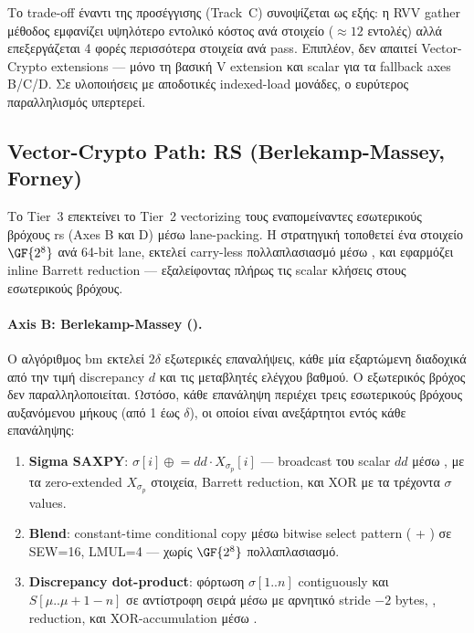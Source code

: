Το trade-off έναντι της \Zvbc προσέγγισης (Track~C) συνοψίζεται ως εξής:
η RVV gather μέθοδος εμφανίζει υψηλότερο εντολικό κόστος ανά στοιχείο
($\approx\num{12}$ εντολές) αλλά επεξεργάζεται \num{4} φορές περισσότερα
στοιχεία ανά pass.  Επιπλέον, δεν απαιτεί Vector-Crypto extensions —
μόνο τη βασική V extension και scalar \Zbc για τα fallback axes B/C/D.
Σε υλοποιήσεις με αποδοτικές indexed-load μονάδες, ο ευρύτερος
παραλληλισμός υπερτερεί.

\subsection{Vector-Crypto Path: \Zvbc RS (Berlekamp-Massey, Forney)}
\label{sec:decode-zvbc-bm-forney}

Το Tier~3 επεκτείνει το Tier~2 vectorizing τους εναπομείναντες εσωτερικούς
βρόχους \gls{rs} (Axes B και D) μέσω \Zvbc {} lane-packing.
Η στρατηγική τοποθετεί ένα στοιχείο $\GF{2^8}$ ανά 64-bit lane, εκτελεί
carry-less πολλαπλασιασμό μέσω , και εφαρμόζει inline
Barrett reduction — εξαλείφοντας πλήρως τις scalar  κλήσεις
στους εσωτερικούς βρόχους.

\paragraph{Axis B: Berlekamp-Massey ().}
Ο αλγόριθμος \gls{bm} εκτελεί $2\delta$ εξωτερικές επαναλήψεις, κάθε μία
εξαρτώμενη διαδοχικά από την τιμή discrepancy $d$ και τις μεταβλητές
ελέγχου βαθμού.  Ο εξωτερικός βρόχος δεν παραλληλοποιείται.  Ωστόσο, κάθε
επανάληψη περιέχει τρεις εσωτερικούς βρόχους αυξανόμενου μήκους (από
\num{1} έως $\delta$), οι οποίοι είναι ανεξάρτητοι εντός κάθε επανάληψης:

\begin{enumerate}
  \item \textbf{Sigma SAXPY}: $\sigma[i] \mathrel{\oplus}= dd \cdot X_{\sigma_p}[i]$
        — broadcast του scalar $dd$ μέσω , 
        με τα zero-extended $X_{\sigma_p}$ στοιχεία, Barrett reduction, και
        XOR με τα τρέχοντα $\sigma$ values.
  \item \textbf{Blend}: constant-time conditional copy μέσω bitwise select
        pattern ( + ) σε SEW=16, LMUL=4 — χωρίς
        $\GF{2^8}$ πολλαπλασιασμό.
  \item \textbf{Discrepancy dot-product}: φόρτωση $\sigma[1..n]$ contiguously
        και $S[\mu..\mu+1-n]$ σε αντίστροφη σειρά μέσω  με
        αρνητικό stride $-2$ bytes, , reduction, και
        XOR-accumulation μέσω .
\end{enumerate}

